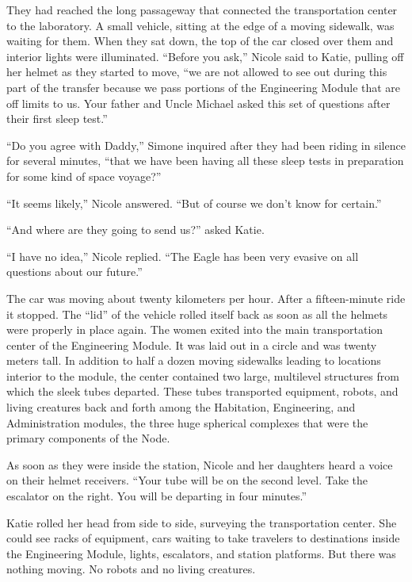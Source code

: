 \documentclass[]{article}
\begin{document}
{They had reached the long passageway that connected the transportation center to the laboratory.  A small vehicle, sitting at the edge of a moving sidewalk, was waiting for them.  When they sat down, the top of the car closed over them and interior lights were illuminated.  “Before you ask,” Nicole said to Katie, pulling off her helmet as they started to move, “we are not allowed to see out during this part of the transfer because we pass portions of the Engineering Module that are off limits to us.  Your father and Uncle Michael asked this set of questions after their first sleep test.”

“Do you agree with Daddy,” Simone inquired after they had been riding in silence for several minutes, “that we have been having all these sleep tests in preparation for some kind of space voyage?”

“It seems likely,” Nicole answered.  “But of course we don’t know for certain.”

“And where are they going to send us?” asked Katie.

“I have no idea,” Nicole replied.  “The Eagle has been very evasive on all questions about our future.”

The car was moving about twenty kilometers per hour.  After a fifteen-minute ride it stopped.  The “lid” of the vehicle rolled itself back as soon as all the helmets were properly in place again.  The women exited into the main transportation center of the Engineering Module.  It was laid out in a circle and was twenty meters tall.  In addition to half a dozen moving sidewalks leading to locations interior to the module, the center contained two large, multilevel structures from which the sleek tubes departed.  These tubes transported equipment, robots, and living creatures back and forth among the Habitation, Engineering, and Administration modules, the three huge spherical complexes that were the primary components of the Node.

As soon as they were inside the station, Nicole and her daughters heard a voice on their helmet receivers.  “Your tube will be on the second level.  Take the escalator on the right.  You will be departing in four minutes.”

Katie rolled her head from side to side, surveying the transportation center.  She could see racks of equipment, cars waiting to take travelers to destinations inside the Engineering Module, lights, escalators, and station platforms.  But there was nothing moving.  No robots and no living creatures.

}
\end{document}
